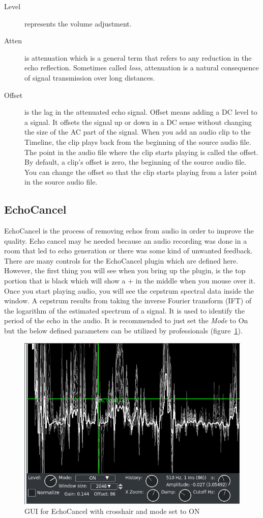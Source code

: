 \begin{description}
    \item[Level] represents the volume adjustment.
    \item[Atten] is attenuation which is a general term that refers to any reduction in the echo reflection. Sometimes called \textit{loss}, attenuation is a natural consequence of signal transmission over long distances.    
    \item[Offset] is the lag in the attenuated echo signal. Offset means adding a DC level to a signal. It offsets the signal up or down in a DC sense without changing the size of the AC part of the signal. When you add an audio clip to the Timeline, the clip plays back from the beginning of the source audio file. The point in the audio file where the clip starts playing is called the offset. By default, a clip’s offset is zero, the beginning of the source audio file. You can change the offset so that the clip starts playing from a later point in the source audio file.
\end{description}

\subsection{EchoCancel}%
\label{sub:echocancel}

EchoCancel is the process of removing echos from audio in order to improve the quality. Echo cancel may be needed because an audio recording was done in a room that led to echo generation or there was some kind of unwanted feedback. There are many controls for the EchoCancel plugin which are defined here. However, the first thing you will see when you bring up the plugin, is the top portion that is black which will show a + in the middle when you mouse over it. Once you start playing audio, you will see the cepstrum spectral data inside the window. A cepstrum results from taking the inverse Fourier transform (IFT) of the logarithm of the estimated spectrum of a signal. It is used to identify the period of the echo in the audio. It is recommended to just set the \textit{Mode} to On but the below defined parameters can be utilized by professionals (figure~\ref{fig:echo-cancel}).

\begin{figure}[htpb]
    \centering
    \includegraphics[width=0.8\linewidth]{images/echo-cancel.png}
    \caption{GUI for EchoCancel with crosshair and mode set to ON}
    \label{fig:echo-cancel}
\end{figure}

